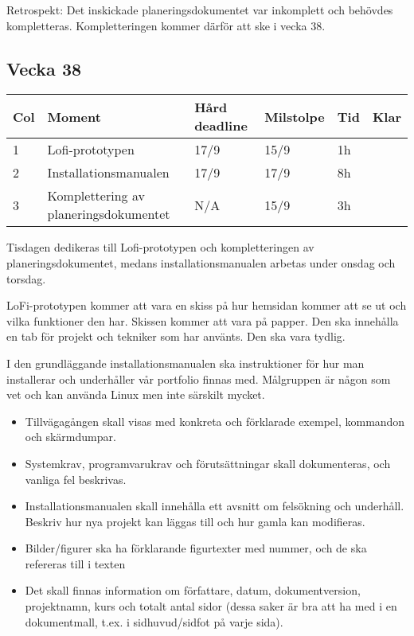 \documentclass{TDP003mall}
\begin{document}
Retrospekt: Det inskickade planeringsdokumentet var inkomplett och behövdes kompletteras. Kompletteringen kommer därför att ske i vecka 38.

\subsection*{Vecka 38}
\begin{table}[!h]
\begin{tabularx}{\linewidth}{|l|X|l|l|l|l|}
\hline
Col & Moment & Hård deadline & Milstolpe & Tid & Klar \\\hline
1 & Lofi-prototypen & 17/9 & 15/9 & 1h \\\hline
2 & Installationsmanualen & 17/9 & 17/9 & 8h \\\hline
3 & Komplettering av planeringsdokumentet & N/A & 15/9 & 3h\\\hline
\end{tabularx}
\end{table}

Tisdagen dedikeras till Lofi-prototypen och kompletteringen av planeringsdokumentet, medans installationsmanualen arbetas under onsdag och torsdag.

LoFi-prototypen kommer att vara en skiss på hur hemsidan kommer att se ut och vilka funktioner den har. Skissen kommer att vara på papper. Den ska innehålla en tab för projekt och tekniker som har använts. Den ska vara tydlig.

I den grundläggande installationsmanualen ska instruktioner för hur man installerar och underhåller vår portfolio finnas med. Målgruppen är någon som vet och kan använda Linux men inte särskilt mycket.

\begin{itemize}
\item
  Tillvägagången skall visas med konkreta och förklarade exempel, kommandon och skärmdumpar.
\item	
  Systemkrav, programvarukrav och förutsättningar skall dokumenteras, och vanliga fel beskrivas.
\item	
  Installationsmanualen skall innehålla ett avsnitt om felsökning och underhåll. Beskriv hur nya projekt kan läggas till och hur gamla kan modifieras.
\item	
  Bilder/figurer ska ha förklarande figurtexter med nummer, och de ska refereras till i texten
\item	
  Det skall finnas information om författare, datum, dokumentversion, projektnamn, kurs och totalt antal sidor (dessa saker är bra att ha med i en dokumentmall, t.ex. i sidhuvud/sidfot på varje sida). 
\end{itemize}
\end{document}
